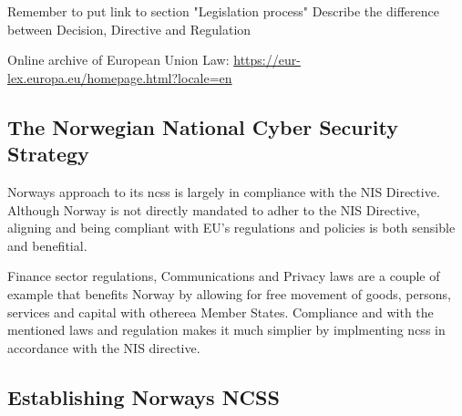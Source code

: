 \begin{followup}
    Remember to put link to section "Legislation process"
    Describe the difference between Decision, Directive and Regulation
\end{followup}

 Online archive of European Union Law: \url{https://eur-lex.europa.eu/homepage.html?locale=en}

\newpage

\subsection{The Norwegian National Cyber Security Strategy}

Norways approach to its \acrshort{ncss} is largely in compliance with the NIS Directive. Although Norway is not directly mandated to adher to the NIS Directive, aligning and being compliant with EU's regulations and policies is both sensible and benefitial. 

Finance sector regulations, Communications and Privacy laws are a couple of example that benefits Norway by allowing for free movement of goods, persons, services and capital with other\acrshort{eea} Member States. Compliance and with the mentioned laws and regulation makes it much simplier by implmenting \acrshort{ncss} in accordance with the NIS directive.

\subsection{Establishing Norways NCSS}

